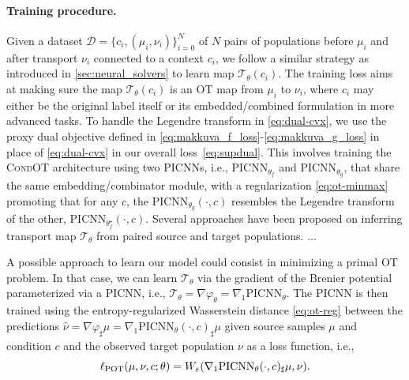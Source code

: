 \paragraph{Training procedure.}

 Given a dataset $\mathcal{D}=\{c_i, (\mu_i, \nu_i) \}_{i=0}^N$ of $N$ pairs of populations before $\mu_i$ and after transport $\nu_i$ connected to a context $c_i$, we follow a similar strategy as introduced in \cref{sec:neural_solvers} to learn map $\mathcal{T}_\theta(c_i)$. 
The training loss aims at making sure the map $\mathcal{T}_\theta(c_i)$ is an OT map from $\mu_i$ to $\nu_i$, where $c_i$ may either be the original label itself or its embedded/combined formulation in more advanced tasks. To handle the Legendre transform in \eqref{eq:dual-cvx}, we use the proxy dual objective defined in \citep[Eq. 6]{makkuva2020optimal} \eqref{eq:makkuva_f_loss}-\eqref{eq:makkuva_g_loss} in place of \eqref{eq:dual-cvx} in our overall loss~\eqref{eq:supdual}.
This involves training the \textsc{CondOT} architecture using two PICNNs, i.e., $\text{PICNN}_{\theta_f}$ and $\text{PICNN}_{\theta_g}$, that share the same embedding/combinator module, with a regularization \eqref{eq:ot-minmax} promoting that for any $c$, the $\text{PICNN}_{\theta_g}(\cdot,c)$ resembles the Legendre transform of the other, $\text{PICNN}_{\theta_f^\star}(\cdot,c)$.
Several approaches have been proposed on inferring transport map $\mathcal{T}_{\theta}$ from paired source and target populations. ...

A possible approach to learn our model could consist in minimizing a primal OT problem. In that case, we can learn $\mathcal{T}_{\theta}$ via the gradient of the Brenier potential parameterized via a PICNN, i.e., $\mathcal{T}_{\theta} = \nabla \varphi_{\theta} = \nabla_1 \text{PICNN}_\theta$.
The PICNN is then trained using the entropy-regularized Wasserstein distance \eqref{eq:ot-reg} between the predictions $\hat{\nu} = \nabla \varphi _\sharp \mu = \nabla_1 \text{PICNN}_\theta (\cdot, c)_\sharp \mu$ given source samples $\mu$ and condition $c$ and the observed target population $\nu$ as a loss function, i.e.,
\begin{equation} \label{eq:pot_loss}
    \ell_\text{POT}(\mu, \nu, c; \theta) = W_{\varepsilon}(\nabla_1 \text{PICNN}_\theta (\cdot, c)_\sharp\mu,\nu).
\end{equation}

